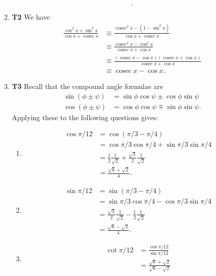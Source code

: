 \documentclass[12pt,oneside]{book}
\DeclareMathOperator{\cosec}{cosec}
\begin{document}
\begin{enumerate}
\[        .\] 
        \item \textbf{T2} We have \begin{align*}
            \frac{\cot^2 x + \sin^2 x}{\cos x + \cosec x} &\equiv \frac{\cosec^2 x - (1 - \sin^2 x)}{\cos x + \cosec x} \\
            &\equiv \frac{\cosec^2 x - \cos^2 x}{\cosec x + \cos x} \\
            &\equiv \frac{(\cosec x - \cos x)(\cosec x + \cos x)}{\cosec x + \cos x} \\
            &\equiv \cosec x - \cos x.
        \end{align*} 
        \item \textbf{T3} Recall that the compound angle formulae are \begin{align*}
            \sin (\phi \pm \psi) &= \sin \phi \cos \psi \pm \cos \phi \sin \psi \\
            \cos (\phi \pm \psi) &= \cos \phi \cos \psi \mp \sin \phi \sin \psi.
        \end{align*} Applying these to the following questions gives: \begin{enumerate}
            \item \begin{align*}
                \cos \pi/12 &= \cos (\pi/3 - \pi/4) \\
                &= \cos \pi/3 \cos \pi/4 + \sin \pi/3 \sin \pi/4 \\
                &= \frac{1}{2} \frac{1}{\sqrt{2} } + \frac{\sqrt{3} }{2} \frac{1}{\sqrt{2} } \\
                &= \frac{\sqrt{6} + \sqrt{2}}{4}.
            \end{align*}
            \item \begin{align*}
                \sin \pi/12 &= \sin (\pi/3 - \pi/4) \\
                &= \sin \pi/3 \cos \pi/4 - \cos \pi/3 \sin \pi/4 \\
                &= \frac{\sqrt{3}}{2} \frac{1}{\sqrt{2}} - \frac{1}{2} \frac{1}{\sqrt{2}} \\
                &= \frac{\sqrt{6} - \sqrt{2}}{4}.
            \end{align*}
            \item \begin{align*}
                \cot \pi/12 &= \frac{\cos \pi/12}{\sin \pi/12} \\
                &= \frac{\sqrt{6} + \sqrt{2}}{\sqrt{6} - \sqrt{2}} \\

\end{align*}
\end{enumerate}
\end{enumerate}
\end{document}
